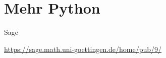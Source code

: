 \documentclass[hyperref={xetex}]{beamer}
\begin{document}
%

\section{Mehr Python}
\begin{frame}[fragile]{Sage}
\begin{center}
\url{https://sage.math.uni-goettingen.de/home/pub/9/}
\end{center}
\end{frame}
\end{document}
